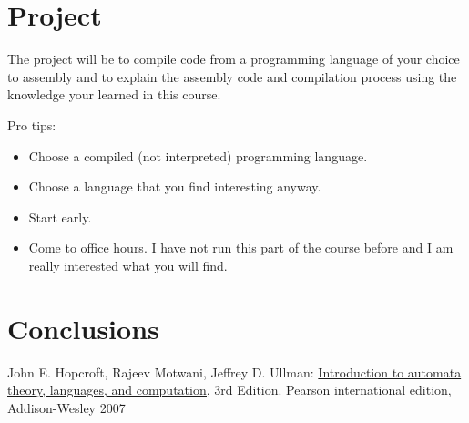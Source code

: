 \documentclass{article}
\theoremstyle{theorem}
\theoremstyle{definition}
\theoremstyle{remark}
\begin{document}
\section{Project}

The project will be to compile code from a programming language of your choice to assembly and to explain the assembly code and compilation process using the knowledge your learned in this course. 


\medskip\noindent
Pro tips:
\begin{itemize}
\item Choose a compiled (not interpreted) programming language.
\item Choose a language that you find interesting anyway.
\item Start early.
\item Come to office hours. I have not run this part of the course before and I am really interested what you will find.
\end{itemize}
 
\section{Conclusions}\label{conclusions}



\begin{thebibliography}{99}
	John E. Hopcroft, Rajeev Motwani, Jeffrey D. Ullman:
\href{http://ce.sharif.edu/courses/94-95/1/ce414-2/resources/root/Text%20Books/Automata/John%20E.%20Hopcroft,%20Rajeev%20Motwani,%20Jeffrey%20D.%20Ullman-Introduction%20to%20Automata%20Theory,%20Languages,%20and%20Computations-Prentice%20Hall%20(2006).pdf}{Introduction to automata theory, languages, and computation,} 3rd Edition. Pearson international edition, Addison-Wesley 2007

\end{thebibliography}
\end{document}
